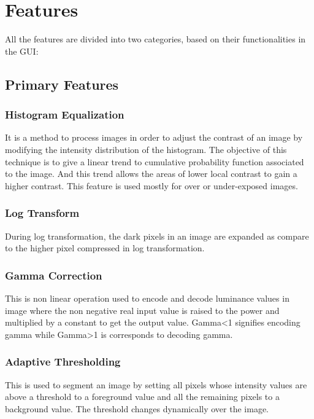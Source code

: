 \section{Features}
All the features are divided into two categories, based on their functionalities in the GUI:

\subsection{Primary Features}

\subsubsection{Histogram Equalization}
It is a method to process images in order to adjust the contrast of an image by modifying the intensity distribution of the histogram. The objective of this technique is to give a linear trend to cumulative probability function associated to the image. And this trend allows the areas of lower local contrast to gain a higher contrast. This feature is used mostly for over or under-exposed images.
\\

\subsubsection{Log Transform}
During log transformation, the dark pixels in an image are expanded as compare to the higher pixel compressed in log transformation.
\\

\subsubsection{Gamma Correction}
This is non linear operation used to encode and decode luminance values in image where the non negative real input value is raised to the power and multiplied by a constant to get the output value. Gamma<1 signifies encoding gamma while Gamma>1 is corresponds to decoding gamma.
\\

\subsubsection{Adaptive Thresholding}
This is used to segment an image by setting all pixels whose intensity values are above a threshold to a foreground value and all the remaining pixels to a background value. The threshold changes dynamically over the image.
\\

